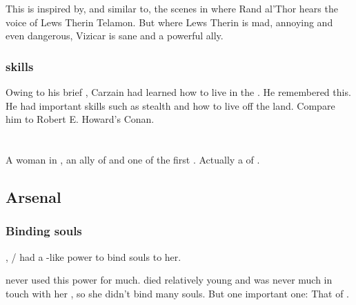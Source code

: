 This is inspired by, and similar to, the scenes in  where Rand al'Thor hears the voice of Lews Therin Telamon. But where Lews Therin is mad, annoying and even dangerous, Vizicar is sane and a powerful ally. 





\subsubsection{\Wylde skills}
Owing to his brief , Carzain had learned how to live in the \wylde. 
He remembered this. 
He had important skills such as stealth and how to live off the land. 
Compare him to Robert E. Howard's Conan.















\section{\Delphine}
\index{\Delphine}
A \human{} woman in , an ally of  and one of the first . 
Actually a  of . 









\subsection{Arsenal}





\subsubsection{Binding souls}
\index{\carcer!\Delphine}
, \Shiaraid{}/\Delphine{} had a \sephirah-like power to bind souls to her. 

\Delphine{} never used this power for much. 
\Delphine{} died relatively young and was never much in touch with her \carcer, so she didn't bind many souls. 
But  one important one: 
That of \Eryal. 









